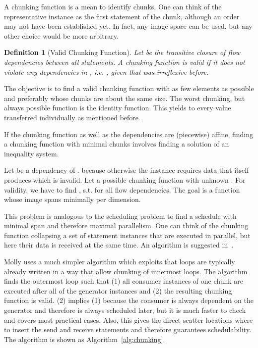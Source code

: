 \documentclass{sigplanconf}
\newtheorem{definition}{Definition}
\begin{document}
A chunking function is a mean to identify chunks. One can think of the representative instance as the first statement of the chunk, although an order may not have been established yet. In fact, any image space can be used, but any other choice would be more arbitrary.


\begin{definition}[Valid Chunking Function]
Let  be the transitive closure of flow dependencies between all statements. A chunking function  is \emph{valid} if it does not violate any dependencies in , i.e. , given that  was irreflexive before.
\end{definition}

The objective is to find a valid chunking function with as few elements as possible and preferably whose chunks are about the same size. The worst chunking, but always possible function is the identity function. This yields to every value transferred individually as mentioned before.

If the chunking function as well as the dependencies are (piecewise) affine, finding a chunking function with minimal chunks involves finding a solution of an inequality system.

Let  be a dependency of .  because otherwise the instance requires data that itself produces which is invalid. Let  a possible chunking function with unknown . For validity, we have to find , s.t.  for all flow dependencies. The goal is a function  whose image spans minimally per dimension.

This problem is analogous to the scheduling problem to find a schedule with minimal span and therefore maximal parallelism. One can think of the chunking function collapsing a set of statement instances that are executed in parallel, but here their data is received at the same time. An algorithm is suggested in~\cite{bastoul03}.

Molly uses a much simpler algorithm which exploits that loops are typically already written in a way that allow chunking of innermost loops. The algorithm finds the outermost loop such that (1) all consumer instances of one chunk are executed after all of the generator instances and (2) the resulting chunking function is valid. (2) implies (1) because the consumer is always dependent on the generator and therefore is always scheduled later, but it is much faster to check and covers most practical cases. Also, this gives the direct scatter locations where to insert the send and receive statements and therefore guarantees schedulability. The algorithm is shown as Algorithm~\ref{alg:chunking}.
\end{document}
